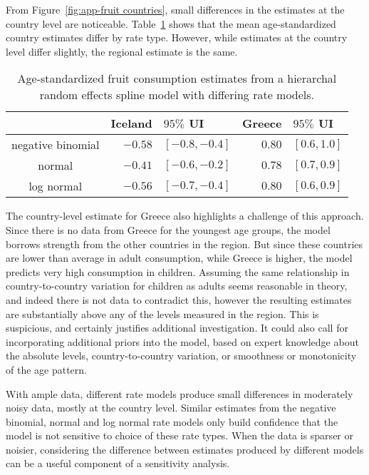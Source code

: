 From Figure~\ref{fig:app-fruit countries},
small differences in the estimates at the country level are noticeable.
Table~\ref{tab:app-fruit rfx} shows that the mean age-standardized
country estimates differ by rate type.  However, while estimates at
the country level differ slightly, the regional estimate is the same.

    \begin{table}[h]
        \begin{center}
        \begin{tabular}{|c|rl|rl|}
            \hline
                & Iceland&$95\%$ UI & Greece&$95\%$ UI \\
            \hline
                negative binomial & $-0.58$&$ [-0.8, -0.4]$ & $0.80$&$ [0.6, 1.0]$ \\
                normal & $-0.41$&$ [-0.6, -0.2]$ & $0.78$&$ [0.7, 0.9]$ \\
                log normal & $-0.56$& $[-0.7, -0.4]$ & $0.80$&$ [0.6, 0.9]$ \\
            \hline
        \end{tabular}
        \end{center}
        \caption{ Age-standardized fruit consumption estimates
          from a hierarchal random effects spline model with differing
          rate models.}
        \label{tab:app-fruit rfx}
    \end{table}

The country-level estimate for Greece also highlights a challenge of
this approach.  Since there is no data from Greece for the youngest
age groups, the model borrows strength from the other countries in the
region.  But since these countries are lower than average in adult
consumption, while Greece is higher, the model predicts very high
consumption in children.  Assuming the same relationship in
country-to-country variation for children as adults seems reasonable
in theory, and indeed there is not data to contradict this, however
the resulting estimates are substantially above any of the levels
measured in the region.  This is suspicious, and certainly justifies
additional investigation.  It could also call for incorporating
additional priors into the model, based on expert knowledge about the
absolute levels, country-to-country variation, or smoothness or
monotonicity of the age pattern.


With ample data, different rate models produce small differences in
moderately noisy data, mostly at the country level.  Similar estimates
from the negative binomial, normal and log normal rate models only
build confidence that the model is not sensitive to choice of these
rate types.  When the data is sparser or noisier, considering the
difference between estimates produced by different models can be a
useful component of a sensitivity analysis.

